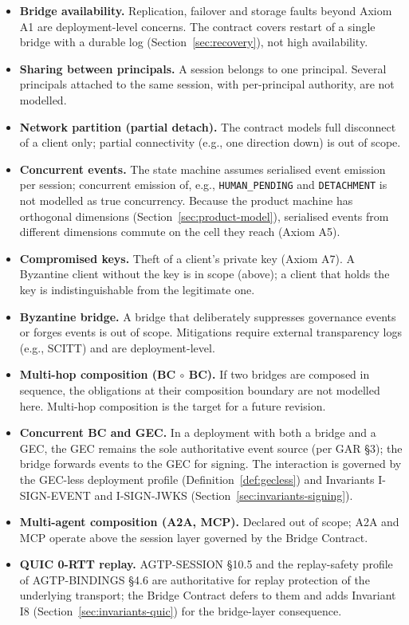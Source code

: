 \begin{itemize}[leftmargin=2em]
\item \textbf{Bridge availability.} Replication, failover and
storage faults beyond Axiom A1 are deployment-level concerns. The
contract covers restart of a single bridge with a durable log
(Section~\ref{sec:recovery}), not high availability.
\item \textbf{Sharing between principals.} A session belongs to one
principal. Several principals attached to the same session, with
per-principal authority, are not modelled.
\item \textbf{Network partition (partial detach).} The contract models
full disconnect of a client only; partial connectivity (e.g., one direction down)
is out of scope.
\item \textbf{Concurrent events.} The state machine assumes serialised
event emission per session; concurrent emission of, e.g.,
\texttt{HUMAN\_PENDING} and \texttt{DETACHMENT} is not modelled as
true concurrency. Because the product machine has orthogonal dimensions
(Section~\ref{sec:product-model}), serialised events from different
dimensions commute on the cell they reach (Axiom A5).
\item \textbf{Compromised keys.} Theft of a client's private key (Axiom A7). A Byzantine client without the key
is in scope (above); a client that holds the key is indistinguishable
from the legitimate one.
\item \textbf{Byzantine bridge.} A bridge that deliberately suppresses
governance events or forges events is out of scope.
Mitigations require external transparency logs (e.g., SCITT) and are
deployment-level.
\item \textbf{Multi-hop composition (BC $\circ$ BC).} If two bridges
are composed in sequence, the obligations at their composition boundary
are not modelled here. Multi-hop composition is the target for a future
revision.
\item \textbf{Concurrent BC and GEC.} In a deployment with both a
bridge and a GEC, the GEC remains the sole authoritative event source
(per GAR \S 3); the bridge forwards events to the GEC for signing.
The interaction is governed by the GEC-less deployment profile
(Definition~\ref{def:gecless}) and Invariants I-SIGN-EVENT and I-SIGN-JWKS
(Section~\ref{sec:invariants-signing}).
\item \textbf{Multi-agent composition (A2A, MCP).} Declared out of
scope; A2A and MCP operate above the session layer governed by the
Bridge Contract.
\item \textbf{QUIC 0-RTT replay.} AGTP-SESSION \S 10.5 and the
replay-safety profile of AGTP-BINDINGS \S 4.6 are authoritative for replay
protection of the underlying transport; the
Bridge Contract defers to them and adds Invariant I8
(Section~\ref{sec:invariants-quic}) for the bridge-layer consequence.
\end{itemize}

